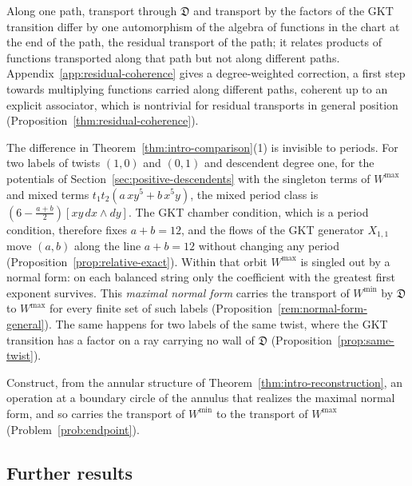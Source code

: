 Along one path,
transport through $\mathfrak D$ and transport by the factors of the GKT
transition differ by one
automorphism of the algebra of functions in the chart at the end of the
path, the residual transport of the path; it relates products of functions
transported along that path but not along different paths.  Appendix~\ref{app:residual-coherence} gives a
degree-weighted correction, a first step towards multiplying functions
carried along different paths, coherent up to an explicit associator, which
is nontrivial for residual transports in general position
(Proposition~\ref{thm:residual-coherence}).

The difference in Theorem~\ref{thm:intro-comparison}(1) is invisible to
periods.  For two labels of twists $(1,0)$ and $(0,1)$ and descendent
degree one, for the potentials of
Section~\ref{sec:positive-descendents} with the singleton terms of
$W^{\max}$ and mixed terms $t_1t_2(a\,xy^5+b\,x^5y)$, the mixed period class is
$(6-\frac{a+b}2)[xy\,dx\wedge dy]$.  The GKT chamber condition, which is a
period condition, therefore fixes $a+b=12$, and the flows of the GKT
generator $X_{1,1}$ move $(a,b)$ along the line $a+b=12$ without changing any
period (Proposition~\ref{prop:relative-exact}).  Within that orbit $W^{\max}$
is singled out by a normal form: on each balanced string only the coefficient with
the greatest first exponent survives.  This \emph{maximal normal form} carries
the transport of $W^{\min}$ by $\mathfrak D$ to $W^{\max}$ for every finite
set of such labels (Proposition~\ref{rem:normal-form-general}).  The same happens for
two labels of the same twist, where the GKT transition has a factor on a ray
carrying no wall of $\mathfrak D$ (Proposition~\ref{prop:same-twist}).

\begin{mainproblem}
Construct, from the annular structure of
Theorem~\ref{thm:intro-reconstruction}, an operation at a boundary circle of
the annulus that realizes the maximal normal form, and so carries the
transport of $W^{\min}$ to the transport of $W^{\max}$
(Problem~\ref{prob:endpoint}).
\end{mainproblem}

\subsection{Further results}

